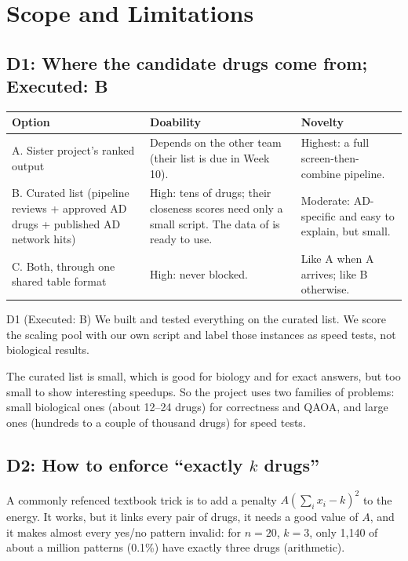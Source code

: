 \section{Scope and Limitations}
\label{sec:decisions}

\subsection{D1: Where the candidate drugs come from; Executed: B}

\begin{table}[H]
\centering
\small
\begin{tabularx}{\linewidth}{>{\raggedright\arraybackslash}p{3.0cm}XX}
\toprule
Option & Doability & Novelty \\
\midrule
A. Sister project's ranked output & Depends on the other team (their list is due in Week 10). & Highest: a full screen-then-combine pipeline. \\
B. Curated list (pipeline reviews + approved AD drugs + published AD network hits) & High: tens of drugs; their closeness scores need only a small script. The data of \cite{cheng2019combinations} is ready to use. & Moderate: AD-specific and easy to explain, but small. \\
C. Both, through one shared table format & High: never blocked. & Like A when A arrives; like B otherwise. \\
\bottomrule
\end{tabularx}
\end{table}

\begin{decision}{D1 (Executed: B)}
We built and tested everything on the curated list. We score the scaling pool with our own script and label those instances as speed tests, not biological results.
\end{decision}

The curated list is small, which is good for biology and for exact answers, but too small to show interesting speedups. So the project uses two families of problems: small biological ones (about 12--24 drugs) for correctness and QAOA, and large ones (hundreds to a couple of thousand drugs) for speed tests.

\subsection{D2: How to enforce ``exactly $k$ drugs''}

A commonly refenced textbook trick is to add a penalty $A(\sum_i x_i-k)^2$ to the energy. It works, but it links every pair of drugs, it needs a good value of $A$, and it makes almost every yes/no pattern invalid: for $n=20$, $k=3$, only 1{,}140 of about a million patterns (0.1\%) have exactly three drugs \established{} (arithmetic).

